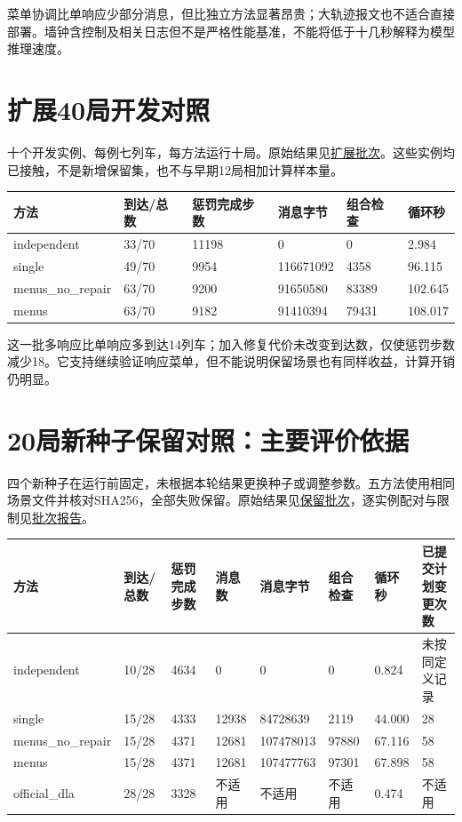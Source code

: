 菜单协调比单响应少部分消息，但比独立方法显著昂贵；大轨迹报文也不适合直接部署。墙钟含控制及相关日志但不是严格性能基准，不能将低于十几秒解释为模型推理速度。

\hypertarget{ux6269ux5c5540ux5c40ux5f00ux53d1ux5bf9ux7167}{%
\section{扩展40局开发对照}\label{ux6269ux5c5540ux5c40ux5f00ux53d1ux5bf9ux7167}}

十个开发实例、每例七列车，每方法运行十局。原始结果见\href{../expr/004-distributed-agent-core/runs/20261111-213049-aligned-ablation.json}{扩展批次}。这些实例均已接触，不是新增保留集，也不与早期12局相加计算样本量。

\begin{longtable}[]{@{}llllll@{}}
\toprule
方法 & 到达/总数 & 惩罚完成步数 & 消息字节 & 组合检查 & 循环秒 \\
\midrule
\endhead
independent & 33/70 & 11198 & 0 & 0 & 2.984 \\
single & 49/70 & 9954 & 116671092 & 4358 & 96.115 \\
menus\_no\_repair & 63/70 & 9200 & 91650580 & 83389 & 102.645 \\
menus & 63/70 & 9182 & 91410394 & 79431 & 108.017 \\
\bottomrule
\end{longtable}

这一批多响应比单响应多到达14列车；加入修复代价未改变到达数，仅使惩罚步数减少18。它支持继续验证响应菜单，但不能说明保留场景也有同样收益，计算开销仍明显。

\hypertarget{ux5c40ux65b0ux79cdux5b50ux4fddux7559ux5bf9ux7167ux4e3bux8981ux8bc4ux4ef7ux4f9dux636e}{%
\section{20局新种子保留对照：主要评价依据}\label{ux5c40ux65b0ux79cdux5b50ux4fddux7559ux5bf9ux7167ux4e3bux8981ux8bc4ux4ef7ux4f9dux636e}}

四个新种子在运行前固定，未根据本轮结果更换种子或调整参数。五方法使用相同场景文件并核对SHA256，全部失败保留。原始结果见\href{../expr/004-distributed-agent-core/runs/20261111-221706-aligned-ablation.json}{保留批次}，逐实例配对与限制见\href{../expr/004-distributed-agent-core/runs/20261111-221706-aligned-ablation.md}{批次报告}。

\begin{longtable}[]{@{}llllllll@{}}
\toprule
方法 & 到达/总数 & 惩罚完成步数 & 消息数 & 消息字节 & 组合检查 & 循环秒 &
已提交计划变更次数 \\
\midrule
\endhead
independent & 10/28 & 4634 & 0 & 0 & 0 & 0.824 & 未按同定义记录 \\
single & 15/28 & 4333 & 12938 & 84728639 & 2119 & 44.000 & 28 \\
menus\_no\_repair & 15/28 & 4371 & 12681 & 107478013 & 97880 & 67.116 & 58 \\
menus & 15/28 & 4371 & 12681 & 107477763 & 97301 & 67.898 & 58 \\
official\_dla & 28/28 & 3328 & 不适用 & 不适用 & 不适用 & 0.474 & 不适用 \\
\bottomrule
\end{longtable}

